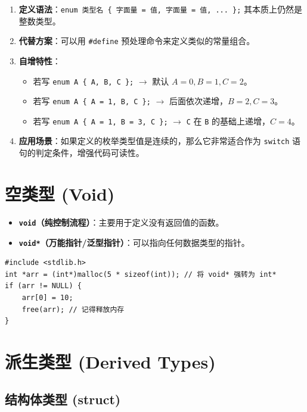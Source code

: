 \begin{enumerate}
    \item \textbf{定义语法}：\texttt{enum 类型名 \{ 字面量 = 值, 字面量 = 值, ... \};} 其本质上仍然是整数类型。
    \item \textbf{代替方案}：可以用 \texttt{\#define} 预处理命令来定义类似的常量组合。
    \item \textbf{自增特性}：
    \begin{itemize}
        \item 若写 \texttt{enum A \{ A, B, C \};} $\rightarrow$ 默认 $A=0, B=1, C=2$。
        \item 若写 \texttt{enum A \{ A = 1, B, C \};} $\rightarrow$ 后面依次递增，$B=2, C=3$。
        \item 若写 \texttt{enum A \{ A = 1, B = 3, C \};} $\rightarrow$ \texttt{C} 在 \texttt{B} 的基础上递增，$C=4$。
    \end{itemize}
    \item \textbf{应用场景}：如果定义的枚举类型值是连续的，那么它非常适合作为 \texttt{switch} 语句的判定条件，增强代码可读性。
\end{enumerate}

\section{空类型 (Void)}

\begin{itemize}
    \item \textbf{\texttt{void}（纯控制流程）}：主要用于定义没有返回值的函数。
    \item \textbf{\texttt{void*}（万能指针/泛型指针）}：可以指向任何数据类型的指针。
\end{itemize}

\begin{lstlisting}[caption={void* 使用示例}]
#include <stdlib.h>
int *arr = (int*)malloc(5 * sizeof(int)); // 将 void* 强转为 int*
if (arr != NULL) {
    arr[0] = 10;
    free(arr); // 记得释放内存
}
\end{lstlisting}

\section{派生类型 (Derived Types)}

\subsection{结构体类型 (struct)}

